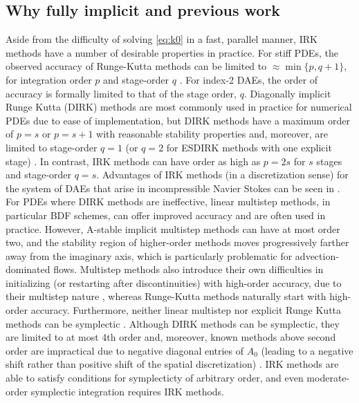\documentclass[review]{siamart}
\begin{document}
\subsection{Why fully implicit and previous work}\label{sec:intro:hist}

Aside from the difficulty of solving \eqref{eq:k0} in a fast, parallel manner,
IRK methods have a number of desirable properties in practice. For stiff PDEs,
the observed accuracy of Runge-Kutta methods can be limited to $\approx \min\{p,
q+1\}$, for integration order $p$ and stage-order $q$ \cite{hairer96,kennedy16}.
For index-2 DAEs, the order of accuracy is formally limited to that of the stage
order, $q$. Diagonally implicit Runge Kutta (DIRK) methods are most commonly
used in practice for numerical PDEs due to ease of implementation, but DIRK
methods have a maximum order of $p=s$ or $p=s+1$ with reasonable stability
properties \cite[Section IV.6]{hairer96} and, moreover, are limited to
stage-order $q=1$ (or $q=2$ for ESDIRK methods with one explicit stage)
\cite{kennedy16}. In contrast, IRK methods can have order as high as $p=2s$ for
$s$ stages and stage-order $q = s$. Advantages of IRK methods (in a
discretization sense) for the system of DAEs that arise in incompressible Navier
Stokes can be seen in \cite{Sanderse.2013}. For PDEs where DIRK methods are
ineffective, linear multistep methods, in particular BDF schemes, can offer
improved accuracy and are often used in practice. However, A-stable implicit
multistep methods can have at most order two, and the stability region of
higher-order methods moves progressively farther away from the imaginary axis,
which is particularly problematic for advection-dominated flows. Multistep
methods also introduce their own difficulties in initializing (or restarting
after discontinuities) with high-order accuracy, due to their multistep nature
\cite[Chapter 4]{brenan1995numerical}, whereas Runge-Kutta methods naturally
start with high-order accuracy. Furthermore, neither linear multistep nor
explicit Runge Kutta methods can be symplectic \cite{Hairer.2002}. Although DIRK
methods can be symplectic, they are limited to at most 4th order and, moreover,
known methods above second order are impractical due to negative diagonal
entries of $A_0$ (leading to a negative shift rather than positive shift of the
spatial discretization) \cite{kennedy16}. IRK methods are able to satisfy
conditions for symplecticty of arbitrary order, and even moderate-order
symplectic integration requires IRK methods.
\end{document}
